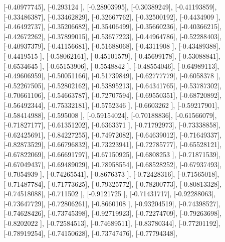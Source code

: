 \documentclass{article}
\begin{document}
       [-0.40977745],
       [-0.293124  ],
       [-0.28903995],
       [-0.30389249],
       [-0.41193859],
       [-0.33486387],
       [-0.33462829],
       [-0.32667762],
       [-0.32500192],
       [-0.4434909 ],
       [-0.46492737],
       [-0.35206682],
       [-0.35406499],
       [-0.35660236],
       [-0.40366215],
       [-0.42672262],
       [-0.37899015],
       [-0.53677223],
       [-0.44964786],
       [-0.52288403],
       [-0.40937379],
       [-0.41156681],
       [-0.51688068],
       [-0.4311908 ],
       [-0.43489388],
       [-0.4419515 ],
       [-0.58062161],
       [-0.45101579],
       [-0.45699178],
       [-0.53088841],
       [-0.6534645 ],
       [-0.65153906],
       [-0.5548842 ],
       [-0.48554046],
       [-0.64989113],
       [-0.49606959],
       [-0.50051166],
       [-0.51739849],
       [-0.62777779],
       [-0.6058378 ],
       [-0.52267505],
       [-0.52802162],
       [-0.53895213],
       [-0.64341765],
       [-0.53787302],
       [-0.70661106],
       [-0.54663787],
       [-0.72707594],
       [-0.69550351],
       [-0.68720892],
       [-0.56492344],
       [-0.75332181],
       [-0.5752346 ],
       [-0.6603262 ],
       [-0.59217901],
       [-0.58414988],
       [-0.595008  ],
       [-0.59154024],
       [-0.70188836],
       [-0.61566079],
       [-0.71827177],
       [-0.61351202],
       [-0.6363371 ],
       [-0.71792973],
       [-0.73338858],
       [-0.62425691],
       [-0.84227255],
       [-0.74972082],
       [-0.64639012],
       [-0.71649337],
       [-0.82873529],
       [-0.66796832],
       [-0.73223941],
       [-0.72785777],
       [-0.65528121],
       [-0.67822069],
       [-0.66691797],
       [-0.67150925],
       [-0.6808253 ],
       [-0.71871539],
       [-0.67049437],
       [-0.69489029],
       [-0.78958554],
       [-0.68528252],
       [-0.67937493],
       [-0.7054939 ],
       [-0.74265541],
       [-0.8676373 ],
       [-0.72428316],
       [-0.71565018],
       [-0.71487784],
       [-0.71773625],
       [-0.79325772],
       [-0.78200773],
       [-0.80813328],
       [-0.74518088],
       [-0.711502  ],
       [-0.9121725 ],
       [-0.71431717],
       [-0.92288063],
       [-0.73647729],
       [-0.72806261],
       [-0.8660108 ],
       [-0.93204519],
       [-0.74398527],
       [-0.74628426],
       [-0.73745398],
       [-0.92719923],
       [-0.72274709],
       [-0.79263698],
       [-0.8202022 ],
       [-0.72584513],
       [-0.74689511],
       [-0.83780344],
       [-0.77201192],
       [-0.78919254],
       [-0.74150628],
       [-0.73747476],
       [-0.77794348],
\end{document}
